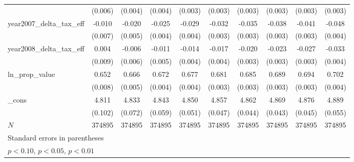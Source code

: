 {\begin{tabular}{l*{9}{c}}
            &     (0.006)         &     (0.004)         &     (0.004)         &     (0.003)         &     (0.003)         &     (0.003)         &     (0.003)         &     (0.003)         &     (0.003)         \\
[1em]
year2007_delta_tax_eff&      -0.010         &      -0.020\sym{***}&      -0.025\sym{***}&      -0.029\sym{***}&      -0.032\sym{***}&      -0.035\sym{***}&      -0.038\sym{***}&      -0.041\sym{***}&      -0.048\sym{***}\\
            &     (0.007)         &     (0.005)         &     (0.004)         &     (0.004)         &     (0.003)         &     (0.003)         &     (0.003)         &     (0.003)         &     (0.004)         \\
[1em]
year2008_delta_tax_eff&       0.004         &      -0.006         &      -0.011\sym{**} &      -0.014\sym{***}&      -0.017\sym{***}&      -0.020\sym{***}&      -0.023\sym{***}&      -0.027\sym{***}&      -0.033\sym{***}\\
            &     (0.009)         &     (0.006)         &     (0.005)         &     (0.004)         &     (0.004)         &     (0.003)         &     (0.003)         &     (0.003)         &     (0.004)         \\
[1em]
ln_prop_value&       0.652\sym{***}&       0.666\sym{***}&       0.672\sym{***}&       0.677\sym{***}&       0.681\sym{***}&       0.685\sym{***}&       0.689\sym{***}&       0.694\sym{***}&       0.702\sym{***}\\
            &     (0.008)         &     (0.005)         &     (0.004)         &     (0.004)         &     (0.003)         &     (0.003)         &     (0.003)         &     (0.003)         &     (0.004)         \\
[1em]
_cons       &       4.811\sym{***}&       4.833\sym{***}&       4.843\sym{***}&       4.850\sym{***}&       4.857\sym{***}&       4.862\sym{***}&       4.869\sym{***}&       4.876\sym{***}&       4.889\sym{***}\\
            &     (0.102)         &     (0.072)         &     (0.059)         &     (0.051)         &     (0.047)         &     (0.044)         &     (0.043)         &     (0.045)         &     (0.055)         \\
\hline
\(N\)       &      374895         &      374895         &      374895         &      374895         &      374895         &      374895         &      374895         &      374895         &      374895         \\
\hline\hline
\multicolumn{10}{p{\linewidth}}{\footnotesize Standard errors in parentheses}\\
\multicolumn{10}{p{\linewidth}}{\footnotesize \sym{*} \(p<0.10\), \sym{**} \(p<0.05\), \sym{***} \(p<0.01\)}\\
\end{tabular}
}
